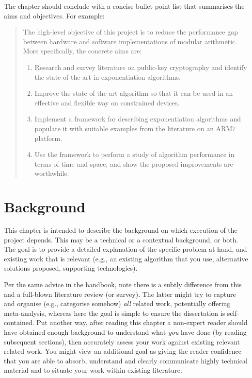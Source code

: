 \documentclass[ oneside,%
                    author={Michael Wray},
                    degree={BSc},
                     title={Some Structural Guidelines for CS Project Dissertations \\ With a Second Line Added to the Title},
                    unit={COMS30045},
                    subtitle={And Even A Fancy Subtitle}]{dissertation}
\begin{document}
The chapter should conclude with a concise bullet point list that summarises the aims and objectives.  For example:

\begin{quote}
\noindent
The high-level objective of this project is to reduce the performance 
gap between hardware and software implementations of modular arithmetic.  
More specifically, the concrete aims are:

\begin{enumerate}
\item Research and survey literature on public-key cryptography and
      identify the state of the art in exponentiation algorithms.
\item Improve the state of the art algorithm so that it can be used
      in an effective and flexible way on constrained devices.
\item Implement a framework for describing exponentiation algorithms
      and populate it with suitable examples from the literature on 
      an ARM7 platform.
\item Use the framework to perform a study of algorithm performance
      in terms of time and space, and show the proposed improvements
      are worthwhile.
\end{enumerate}
\end{quote}


\chapter{Background}
\label{chap:technical}


\noindent
This chapter is intended to describe the background on which execution of the project depends. This may be a technical or a contextual background, or both. The goal is to provide a detailed explanation of the specific problem at hand, and existing work that is relevant (e.g., an existing algorithm that you use, alternative solutions proposed, supporting technologies).  

Per the same advice in the handbook, note there is a subtly difference from this and a full-blown literature review (or survey).  The latter might try to capture and organise (e.g., categorise somehow) \emph{all} related work, potentially offering meta-analysis, whereas here the goal is simple to ensure the dissertation is self-contained.  Put another way, after reading this chapter a non-expert reader should have obtained enough background to understand what \emph{you} have done (by reading subsequent sections), then accurately assess your work against existing relevant related work.  You might view an additional goal as giving the reader confidence that you are able to absorb, understand and clearly communicate highly technical material and to situate your work within existing literature.
\end{document}
